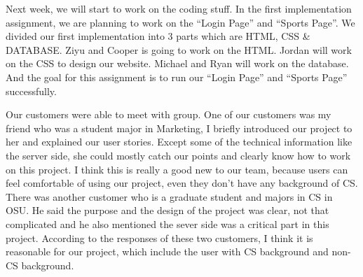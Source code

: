 \documentclass[a4paper]{article}
\begin{document}
Next week, we will start to work on the coding stuff. In the first implementation assignment, we are planning to work on the “Login Page” and “Sports Page”. We divided our first implementation into 3 parts which are HTML, CSS \& DATABASE. Ziyu and Cooper is going to work on the HTML. Jordan will work on the CSS to design our website. Michael and Ryan will work on the database. And the goal for this assignment is to run our “Login Page” and “Sports Page” successfully. 

Our customers were able to meet with group. One of our customers was my friend who was a student major in Marketing, I briefly introduced our project to her and explained our user stories. Except some of the technical information like the server side, she could mostly catch our points and clearly know how to work on this project. I think this is really a good new to our team, because users can feel comfortable of using our project, even they don’t have any background of CS. There was another customer who is a graduate student and majors in CS in OSU. He said the purpose and the design of the project was clear, not that complicated and he also mentioned the sever side was a critical part in this project. 
According to the responses of these two customers, I think it is reasonable for our project, which include the user with CS background and non-CS background. 
\end{document}
